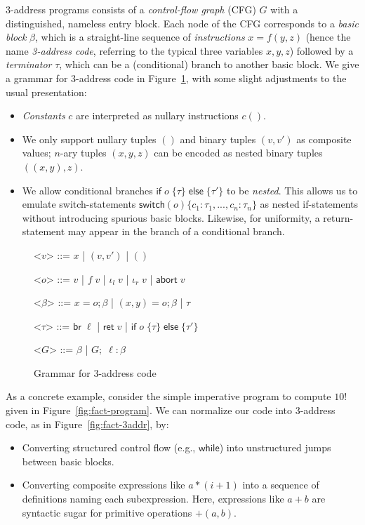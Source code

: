\documentclass[acmsmall,screen,review]{acmart}
\newcommand{\ms}[1]{\ensuremath{\mathsf{#1}}}
\newcommand{\linl}[1]{\iota_l\;{#1}}
\newcommand{\linr}[1]{\iota_r\;{#1}}
\newcommand{\labort}[1]{\ms{abort}\;{#1}}
\newcommand{\ite}[3]{\ms{if}\;#1\;\{#2\}\;\ms{else}\;\{#3\}}
\begin{document}
3-address programs consists of a \emph{control-flow graph} (CFG) $G$ with a distinguished, nameless
entry block. Each node of the CFG corresponds to a \emph{basic block} $\beta$, which is a
straight-line sequence of \emph{instructions} $x = f(y, z)$ (hence the name \emph{3-address code},
referring to the typical three variables $x, y, z$) followed by a \emph{terminator} $\tau$, which
can be a (conditional) branch to another basic block. We give a grammar for 3-address code in
Figure~\ref{fig:3addr-grammar}, with some slight adjustments to the usual presentation:
\begin{itemize}
  \item \emph{Constants} $c$ are interpreted as nullary instructions $c()$.
  
  \item We only support nullary tuples $()$ and binary tuples $(v, v')$ as composite values; $n$-ary
  tuples $(x, y, z)$ can be encoded as nested binary tuples $((x, y), z)$.
  
  \item We allow conditional branches $\ite{o}{\tau}{\tau'}$ to be \emph{nested}.  
  This allows us to emulate switch-statements $\ms{switch}(o) \{c_1 : \tau_1 ,
  ... , c_n : \tau_n\}$ as nested if-statements without introducing spurious basic blocks.
  Likewise, for uniformity, a return-statement may appear in the branch of a conditional branch.
\end{itemize}

\begin{figure}[H]
  \begin{center}
    \begin{grammar}
      <\(v\)> ::= \(x\) \;|\; \((v, v')\) \;|\; \(()\)

      <\(o\)> ::= \(v\) \;|\; \(f\;v\) \;|\; \(\linl{v}\) \;|\; \(\linr{v}\) \;|\; \(\labort{v}\)

      <\(\beta\)> ::=
      \(x = o ; \beta\)
      \;|\; \((x, y) = o ; \beta\)
      \;|\; \(\tau\)

      <\(\tau\)> ::= \(\ms{br}\;\ell\) \;|\; \(\ms{ret}\;v\) \;|\; $\ite{o}{\tau}{\tau'}$
      
      <\(G\)> ::= \(\beta\) \;|\; \(G ;\; \ell : \beta\)
    \end{grammar}
  \end{center}
  \caption{Grammar for 3-address code}
  \Description{}
  \label{fig:3addr-grammar}
\end{figure}

As a concrete example, consider the simple imperative program to compute $10!$ given in
Figure~\ref{fig:fact-program}. We can normalize our code into 3-address code, as in
Figure~\ref{fig:fact-3addr}, by:
\begin{itemize}
  \item Converting structured control flow (e.g., \ms{while}) into unstructured jumps between basic
  blocks.
  \item Converting composite expressions like $a * (i + 1)$ into a sequence of definitions naming
  each subexpression. 
  Here, expressions like $a + b$ are syntactic sugar for primitive operations $+ (a, b)$.
\end{itemize}
\end{document}
